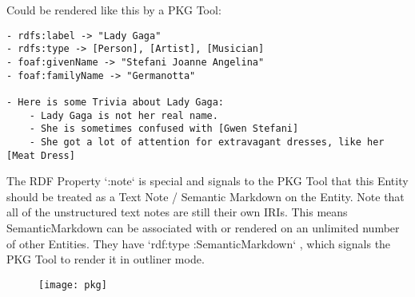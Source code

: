 Could be rendered like this by a PKG Tool:

\begin{lstlisting}
- rdfs:label -> "Lady Gaga"
- rdfs:type -> [Person], [Artist], [Musician]
- foaf:givenName -> "Stefani Joanne Angelina"
- foaf:familyName -> "Germanotta"

- Here is some Trivia about Lady Gaga:
    - Lady Gaga is not her real name.
    - She is sometimes confused with [Gwen Stefani]
    - She got a lot of attention for extravagant dresses, like her [Meat Dress]
\end{lstlisting}


The RDF Property `:note` is special and signals to the PKG Tool that this Entity should be treated as a Text Note / Semantic Markdown on the Entity. Note that all of the unstructured text notes are still their own IRIs. This means SemanticMarkdown can be associated with or rendered on an unlimited number of other Entities. They have `rdf:type :SemanticMarkdown` , which signals the PKG Tool to render it in outliner mode.

\begin{figure}[H]
    \texttt{[image: pkg]}
\end{figure}





